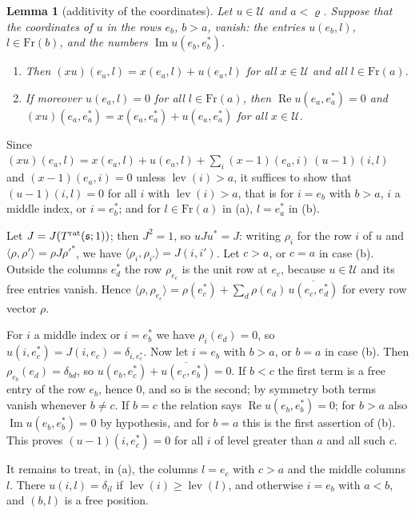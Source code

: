 \documentclass[11pt,a4paper]{article}
\makeatletter
\theoremstyle{plainx}
\newtheorem{lemma}[theorem]{Lemma}
\theoremstyle{uprightx}
\renewenvironment{proof}[1][Proof]{\par\pushQED{\qed}\normalfont\topsep0pt\partopsep0pt
  \trivlist\item[\hskip\labelsep\itshape #1.]\ignorespaces}{\popQED\endtrivlist\@endpefalse}
\newcommand{\cj}[1]{\overline{#1}}
\newcommand{\RePt}{\operatorname{Re}}
\newcommand{\ImPt}{\operatorname{Im}}
\newcommand{\lev}{\operatorname{lev}}
\makeatother
\begin{document}
\begin{lemma}[additivity of the coordinates]\label{l:additive}
Let $u\in\mathcal U$ and $a<\varrho$. Suppose that the coordinates of $u$ in the rows $e_b$, $b>a$, vanish: the
entries $u(e_b,l)$, $l\in\mathrm{Fr}(b)$, and the numbers $\ImPt u(e_b,e^*_b)$.
\begin{enumerate}[label=(\alph*),itemsep=1pt]
\item Then $(xu)(e_a,l)=x(e_a,l)+u(e_a,l)$ for all $x\in\mathcal U$ and all $l\in\mathrm{Fr}(a)$.
\item If moreover $u(e_a,l)=0$ for all $l\in\mathrm{Fr}(a)$, then $\RePt u(e_a,e^*_a)=0$ and
$(xu)(e_a,e^*_a)=x(e_a,e^*_a)+u(e_a,e^*_a)$ for all $x\in\mathcal U$.
\end{enumerate}
\end{lemma}
\begin{proof}
Since $(xu)(e_a,l)=x(e_a,l)+u(e_a,l)+\sum_i(x-1)(e_a,i)\,(u-1)(i,l)$ and $(x-1)(e_a,i)=0$ unless $\lev(i)>a$, it
suffices to show that $(u-1)(i,l)=0$ for all $i$ with $\lev(i)>a$, that is for $i=e_b$ with $b>a$, $i$ a middle
index, or $i=e^*_b$; and for $l\in\mathrm{Fr}(a)$ in (a), $l=e^*_a$ in (b).

Let $J=J(T^{\mathrm{rat}}(\mathfrak{s};1))$; then $J^2=1$, so $uJu^{*}=J$: writing $\rho_i$ for the row $i$ of $u$ and
$\langle\rho,\rho'\rangle=\rho J\rho'^{*}$, we have $\langle\rho_i,\rho_{i'}\rangle=J(i,i')$. Let $c>a$, or $c=a$ in
case (b). Outside the columns $e^*_d$ the row $\rho_{e_c}$ is the unit row at $e_c$, because $u\in\mathcal U$ and
its free entries vanish. Hence $\langle\rho,\rho_{e_c}\rangle=\rho(e^*_c)+\sum_d\rho(e_d)\,\cj{u(e_c,e^*_d)}$ for every
row vector $\rho$.

For $i$ a middle index or $i=e^*_b$ we have $\rho_i(e_d)=0$, so $u(i,e^*_c)=J(i,e_c)=\delta_{i,e^*_c}$. Now let $i=e_b$ with $b>a$, or $b=a$ in case (b). Then $\rho_{e_b}(e_d)=\delta_{bd}$, so
$u(e_b,e^*_c)+\cj{u(e_c,e^*_b)}=0$. If $b<c$ the first term is a free entry of the row $e_b$, hence $0$, and so is
the second; by symmetry both terms vanish whenever $b\ne c$. If $b=c$ the relation says $\RePt u(e_b,e^*_b)=0$;
for $b>a$ also $\ImPt u(e_b,e^*_b)=0$ by hypothesis, and for $b=a$ this is the first assertion of (b). This proves
$(u-1)(i,e^*_c)=0$ for all $i$ of level greater than $a$ and all such $c$.

It remains to treat, in (a), the columns $l=e_c$ with $c>a$ and the middle columns $l$. There $u(i,l)=\delta_{il}$
if $\lev(i)\ge\lev(l)$, and otherwise $i=e_b$ with $a<b$, and $(b,l)$ is a free position.
\end{proof}
\end{document}
